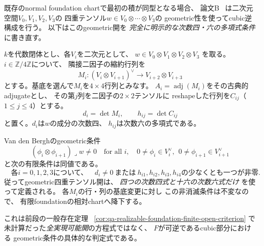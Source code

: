 既存のnormal foundation chartで最初の積が同型となる場合、
論文B~\cite[\texttt{prop:cubic-foundation-open}]{QuadricModuli2026}
は二次元空間$V_0,V_1,V_2,V_3$の
四重テンソル$w\in V_0\otimes\cdots\otimes V_3$の
geometric性を使ってcubic逆構成を行う。
以下はこのgeometric開を
\emph{完全に明示的な次数四・六の多項式条件}に書き直す。

\begin{lemma}[四重テンソルのgeometric性のadjugate判定]
\label{lem:qa-explicit-cubic-geometric-adjugate}
$k$を代数閉体とし、各$V_i$を二次元として、
$w\in V_0\otimes V_1\otimes V_2\otimes V_3$
を取る。$i\in\mathbb Z/4\mathbb Z$について、
隣接二因子の縮約行列を
\[
 M_i:(V_i\otimes V_{i+1})^\vee
       \longrightarrow V_{i+2}\otimes V_{i+3}
\]
とする。基底を選んで$M_i$を$4\times4$行列とみなす。
$A_i=\operatorname{adj}(M_i)$をその古典的adjugateとし、
その第$j$列を二因子の$2\times2$テンソルに
reshapeした行列を$C_{ij}$（$1\le j\le4$）とする。
\[
 d_i=\det M_i,\qquad
 h_{ij}=\det C_{ij}
 \tag{Geo-poly}\label{eq:qa-cubic-geometric-minors}
\]
と置く。$d_i$は$w$の成分の次数四、
$h_{ij}$は次数六の多項式である。

Van den Berghのgeometric条件
\[
 (\phi_i\otimes\phi_{i+1})\mathbin{\lrcorner}w\ne0
 \quad\text{for all }i,\quad
 0\ne\phi_i\in V_i^\vee,\ \
 0\ne\phi_{i+1}\in V_{i+1}^\vee
\]
と次の有限条件は同値である。
\[
 \boxed{\quad
  \text{各$i=0,1,2,3$について、}
  \quad d_i\ne0
  \ \text{または}\ 
  h_{i1},h_{i2},h_{i3},h_{i4}
  \text{の少なくとも一つが非零}.\quad}
 \tag{Geo-test}\label{eq:qa-cubic-geometric-finite-test}
\]
従ってgeometric四重テンソル開は、
\emph{四つの次数四式と十六の次数六式だけ}
を使って定義される。
各$M_i$の行・列の基底変更に対し
この非消滅条件は不変なので、
有限foundationの相対chartへ降下する。

これは前段の一般存在定理
~\ref{cor:qa-realizable-foundation-finite-open-criterion}
で未計算だった\emph{全実現可能開}の方程式ではなく、
$F$が可逆であるcubic部分における
geometric条件の具体的な判定式である。
\end{lemma}
